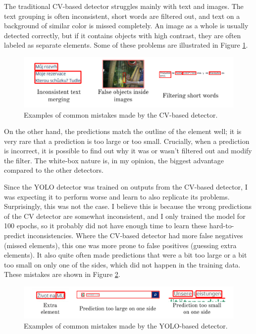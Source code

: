\documentclass[
  digital,     %
  oneside,     %
  nosansbold,  %
  nocolorbold, %
  lof,         %
  lot,         %
]{fithesis4}
\begin{document}
The traditional CV-based detector struggles mainly with text and images. The text grouping is often inconsistent, short words are filtered out, and text on a background of similar color is missed completely. An image as a whole is usually detected correctly, but if it contains objects with high contrast, they are often labeled as separate elements. Some of these problems are illustrated in Figure \ref{fig:cv-mistakes}.

\begin{figure}
    \centering
    \includegraphics[width=1\linewidth]{diagrams/cv_mistakes.pdf}
    \caption{Examples of common mistakes made by the CV-based detector.}
    \label{fig:cv-mistakes}
\end{figure}

On the other hand, the predictions match the outline of the element well; it is very rare that a prediction is too large or too small. Crucially, when a prediction is incorrect, it is possible to find out why it was or wasn't filtered out and modify the filter. The white-box nature is, in my opinion, the biggest advantage compared to the other detectors.

Since the YOLO detector was trained on outputs from the CV-based detector, I was expecting it to perform worse and learn to also replicate its problems. Surprisingly, this was not the case. I believe this is because the wrong predictions of the CV detector are somewhat inconsistent, and I only trained the model for 100 epochs, so it probably did not have enough time to learn these hard-to-predict inconsistencies. Where the CV-based detector had more false negatives (missed elements), this one was more prone to false positives (guessing extra elements). It also quite often made predictions that were a bit too large or a bit too small on only one of the sides, which did not happen in the training data. These mistakes are shown in Figure \ref{fig:yolo-mistakes}.

\begin{figure}
    \centering
    \includegraphics[width=1\linewidth]{diagrams/yolo_mistakes.pdf}
    \caption{Examples of common mistakes made by the YOLO-based detector.}
    \label{fig:yolo-mistakes}
\end{figure}
\end{document}
